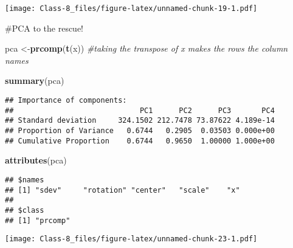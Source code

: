 \documentclass[]{article}
\newenvironment{Shaded}{\begin{snugshade}}{\end{snugshade}}
\newcommand{\CommentTok}[1]{\textcolor[rgb]{0.56,0.35,0.01}{\textit{#1}}}
\newcommand{\DataTypeTok}[1]{\textcolor[rgb]{0.13,0.29,0.53}{#1}}
\newcommand{\DecValTok}[1]{\textcolor[rgb]{0.00,0.00,0.81}{#1}}
\newcommand{\KeywordTok}[1]{\textcolor[rgb]{0.13,0.29,0.53}{\textbf{#1}}}
\newcommand{\NormalTok}[1]{#1}
\newcommand{\OperatorTok}[1]{\textcolor[rgb]{0.81,0.36,0.00}{\textbf{#1}}}
\newcommand{\StringTok}[1]{\textcolor[rgb]{0.31,0.60,0.02}{#1}}
\begin{document}
\texttt{[image: Class-8\_files/figure-latex/unnamed-chunk-19-1.pdf]}

\#PCA to the rescue!

\begin{Shaded}
\begin{Highlighting}[]
\NormalTok{pca <-}\KeywordTok{prcomp}\NormalTok{(}\KeywordTok{t}\NormalTok{(x)) }\CommentTok{#taking the transpose of x makes the rows the column names}
\end{Highlighting}
\end{Shaded}

\begin{Shaded}
\begin{Highlighting}[]
\KeywordTok{summary}\NormalTok{(pca)}
\end{Highlighting}
\end{Shaded}

\begin{verbatim}
## Importance of components:
##                             PC1      PC2      PC3       PC4
## Standard deviation     324.1502 212.7478 73.87622 4.189e-14
## Proportion of Variance   0.6744   0.2905  0.03503 0.000e+00
## Cumulative Proportion    0.6744   0.9650  1.00000 1.000e+00
\end{verbatim}

\begin{Shaded}
\begin{Highlighting}[]
\KeywordTok{attributes}\NormalTok{(pca)}
\end{Highlighting}
\end{Shaded}

\begin{verbatim}
## $names
## [1] "sdev"     "rotation" "center"   "scale"    "x"       
## 
## $class
## [1] "prcomp"
\end{verbatim}

\begin{Shaded}
\end{Shaded}

\texttt{[image: Class-8\_files/figure-latex/unnamed-chunk-23-1.pdf]}
\end{document}
